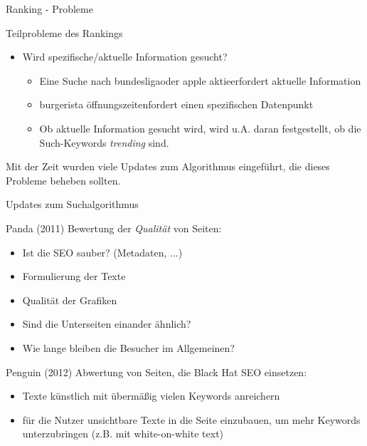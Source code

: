 \documentclass[11pt]{beamer}
\begin{document}
\begin{frame}{Ranking - Probleme}
    \begin{block}{Teilprobleme des Rankings}
        \begin{itemize}
            \item Wird spezifische/aktuelle Information gesucht?
            \begin{itemize}
                \item Eine Suche nach \dq bundesliga\dq oder \dq apple aktie\dq erfordert aktuelle Information
                \item \dq burgerista öffnungszeiten\dq fordert einen spezifischen Datenpunkt
                \item Ob aktuelle Information gesucht wird, wird u.A. daran festgestellt, ob die Such-Keywords \textit{trending} sind.
            \end{itemize}
        \end{itemize}
    \end{block}
    
    Mit der Zeit wurden viele Updates zum Algorithmus eingeführt, die dieses Probleme beheben sollten.
\end{frame}


\begin{frame}{Updates zum Suchalgorithmus}
    \begin{block}{Panda (2011)}
        Bewertung der \textit{Qualität} von Seiten:
        \begin{itemize}
            \item Ist die SEO sauber? (Metadaten, ...)
            \item Formulierung der Texte
            \item Qualität der Grafiken
            \item Sind die Unterseiten einander ähnlich?
            \item Wie lange bleiben die Besucher im Allgemeinen?
        \end{itemize}
    \end{block}
    
    \begin{block}{Penguin (2012)}
        Abwertung von Seiten, die \dq Black Hat \dq SEO einsetzen:
        \begin{itemize}
            \item Texte künstlich mit übermäßig vielen Keywords anreichern
            \item für die Nutzer unsichtbare Texte in die Seite einzubauen, um mehr Keywords unterzubringen (z.B. mit white-on-white text)
        \end{itemize}
    \end{block}
\end{frame}
\end{document}
